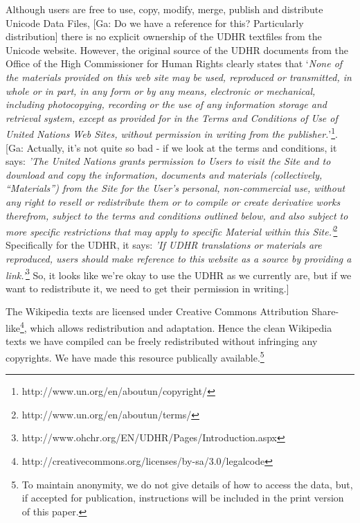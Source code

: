 Although users are free to use, copy, modify, merge, publish and distribute Unicode Data Files, [Ga: Do we have a reference for this? Particularly distribution] there is no explicit ownership of the UDHR textfiles from the Unicode website. However, the original source of the UDHR documents from the Office of the High Commissioner for Human Rights clearly states that `\emph{None of the materials provided on this web site may be used, reproduced or transmitted, in whole or in part, in any form or by any means, electronic or mechanical, including photocopying, recording or the use of any information storage and retrieval system, except as provided for in the Terms and Conditions of Use of United Nations Web Sites, without permission in writing from the publisher.}'\footnote{http://www.un.org/en/aboutun/copyright/}. [Ga: Actually, it's not quite so bad - if we look at the terms and conditions, it says: \emph{'The United Nations grants permission to Users to visit the Site and to download and copy the information, documents and materials (collectively, “Materials”) from the Site for the User’s personal, non-commercial use, without any right to resell or redistribute them or to compile or create derivative works therefrom, subject to the terms and conditions outlined below, and also subject to more specific restrictions that may apply to specific Material within this Site.'}\footnote{http://www.un.org/en/aboutun/terms/} Specifically for the UDHR, it says: \emph{'If UDHR translations or materials are reproduced, users should make reference to this website as a source by providing a link.'}\footnote{http://www.ohchr.org/EN/UDHR/Pages/Introduction.aspx}  So, it looks like we're okay to use the UDHR as we currently are, but if we want to redistribute it, we need to get their permission in writing.]

The Wikipedia texts are licensed under Creative Commons Attribution Share-like\footnote{http://creativecommons.org/licenses/by-sa/3.0/legalcode}, which allows redistribution and adaptation. Hence the clean Wikipedia texts we have compiled can be freely redistributed without infringing any copyrights.  We have made this resource publically available.\footnote{To maintain anonymity, we do not give details of how to access the data, but, if accepted for publication, instructions will be included in the print version of this paper.}


